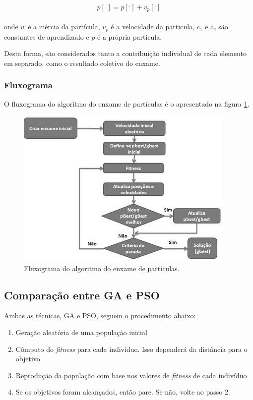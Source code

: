 \documentclass[a4paper,12pt]{article}
\begin{document}
\begin{equation}
	p[^.] = p[^.] + v_p[^.]
\label{eq:particula-pso}
\end{equation}
\\
 onde $w$ é a inércia da partícula, $v_p$ é a velocidade da particula, $c_1$ e $c_2$ são constantes de aprendizado e $p$ é a própria particula.

Desta forma, são considerados tanto a contribuição individual de cada elemento em separado, como o resultado coletivo do enxame.

\subsubsection{Fluxograma}

O fluxograma do algoritmo do enxame de partículas é o apresentado na figura \ref{fig:fluxo-pso}.
\begin{figure}[htb]
\begin{center}
    \includegraphics[scale=0.8]{fluxo-pso.jpg}
    \caption { Fluxograma do algoritmo do enxame de partículas. }
	\label{fig:fluxo-pso}
\end{center}
\end{figure}

\subsection{Comparação entre GA e PSO}

Ambas as técnicas, GA e PSO, seguem o procedimento abaixo:

\begin{enumerate}
\item Geração aleatória de uma população inicial
\item Cômputo do \emph{fitness} para cada indivíduo. Isso dependerá da distância para o objetivo
\item Reprodução da população com base nos valores de \emph{fitness} de cada indivíduo
\item Se os objetivos foram alcançados, então pare. Se não, volte ao passo 2.
\end{enumerate}
\end{document}
